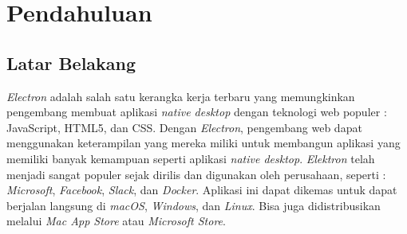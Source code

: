 \chapter{Pendahuluan}
\label{chap:intro}
   
\section{Latar Belakang}
\label{sec:label}

\begin{comment}
Dibutuhkan waktu yang lama bagi para pengembang web yang ingin membuat aplikasi \textit{desktop}, dimana mereka perlu mempelajari bahasa baru bersamaan dengan kerangka kerjanya. Hal ini tentunya akan menjadi penghalang bagi mereka yang mau mengembangkan aplikasi desktop. Maka dari itu, saat ini terdapat sebuah kerangka kerja yang tersedia bagi pengembang web untuk membuat aplikasi \textit{desktop} lintas \textit{platform}. 
\end{comment}


\textit{Electron} adalah salah satu kerangka kerja terbaru yang memungkinkan pengembang membuat aplikasi \textit{native desktop} dengan teknologi web populer : JavaScript, HTML5, dan CSS. Dengan \textit{Electron}, pengembang web dapat menggunakan keterampilan yang mereka miliki untuk membangun aplikasi yang memiliki banyak kemampuan seperti aplikasi \textit{native desktop}. \textit{Elektron} telah menjadi sangat populer sejak dirilis dan digunakan oleh perusahaan, seperti : \textit{Microsoft}, \textit{Facebook}, \textit{Slack}, dan \textit{Docker}. Aplikasi ini dapat dikemas untuk dapat berjalan langsung di \textit{macOS}, \textit{Windows}, dan \textit{Linux}. Bisa juga didistribusikan melalui \textit{Mac App Store} atau \textit{Microsoft Store}.

\begin{comment}
Dalam pembuatan sebuah aplikasi \textit{desktop}, tentunya kita memerlukan \textit{library} untuk membantu kita dalam membuat aplikasi tersebut. Terdapat banyak \textit{library} visualisasi yang tersedia, contohnya : \textit{Vega}, \textit{D3}, dan \textit{Vis.js}. Namun untuk \textit{library} visualisasi \textit{Vega} dan \textit{D3} terlalu \textit{powerful} untuk menangani proyek visualisasi kurikulum dalam bentuk \textit{tree} dan \textit{timeline}. Library visualisasi \textit{Vis.js} sudah sangat memadai untuk menangani proyek tersebut.
\end{comment}

